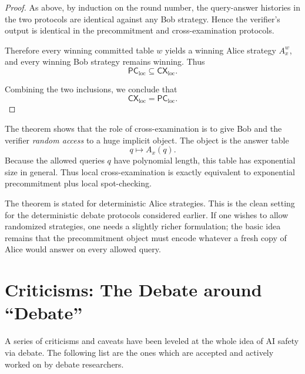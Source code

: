 \documentclass[11pt]{article}
\begin{document}
\begin{proof}
As above, by induction on the round number, the query-answer histories in the two
protocols are identical against any Bob strategy. Hence the verifier's output is
identical in the precommitment and cross-examination protocols.

Therefore every winning committed table \(w\) yields a winning Alice strategy \(A_x^w\),
and every winning Bob strategy remains winning. Thus
\[
\mathsf{PC}_{\mathrm{loc}} \subseteq \mathsf{CX}_{\mathrm{loc}}.
\]

Combining the two inclusions, we conclude that
\[
\mathsf{CX}_{\mathrm{loc}} = \mathsf{PC}_{\mathrm{loc}}.
\]
\end{proof}

\begin{remark}
The theorem shows that the role of cross-examination is to give Bob and the verifier
\emph{random access} to a huge implicit object. The object is the answer table
\[
q \mapsto A_x(q).
\]
Because the allowed queries \(q\) have polynomial length, this table has exponential
size in general. Thus local cross-examination is exactly equivalent to exponential
precommitment plus local spot-checking.
\end{remark}

\begin{remark}
The theorem is stated for deterministic Alice strategies. This is the clean setting for
the deterministic debate protocols considered earlier. If one wishes to allow randomized
strategies, one needs a slightly richer formulation; the basic idea remains that the
precommitment object must encode whatever a fresh copy of Alice would answer on every
allowed query.
\end{remark}

\section{Criticisms: The Debate around ``Debate''}
\label{sec:criticisms}

A series of criticisms and caveats have been leveled at the whole idea of AI
safety via debate. The following list are the ones which are accepted and
actively worked on by debate researchers.
\end{document}
